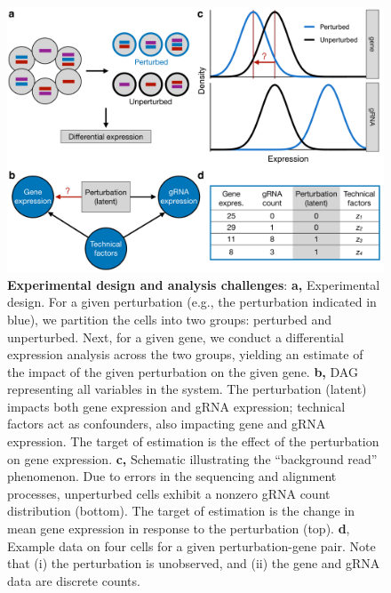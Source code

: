 \documentclass[12pt]{article}
\begin{document}
\begin{figure}[h!]
	\centering
	\includegraphics[width=1\linewidth]{figures/analysis_challenges.pdf}
	\caption{\textbf{Experimental design and analysis challenges}: \textbf{a,} Experimental design. For a given perturbation (e.g., the perturbation indicated in blue), we partition the cells into two groups: perturbed and unperturbed. Next, for a given gene, we conduct a differential expression analysis across the two groups, yielding an estimate of the impact of the given perturbation on the given gene. \textbf{b,} DAG representing all variables in the system. The perturbation (latent) impacts both gene expression and gRNA expression; technical factors act as confounders, also impacting gene and gRNA expression. The target of estimation is the effect of the perturbation on gene expression. \textbf{c,} Schematic illustrating the ``background read'' phenomenon. Due to errors in the sequencing and alignment processes, unperturbed cells exhibit a nonzero gRNA count distribution (bottom). The target of estimation is the change in mean gene expression in response to the perturbation (top). \textbf{d}, Example data on four cells for a given perturbation-gene pair. Note that (i) the perturbation is unobserved, and (ii) the gene and gRNA data are discrete counts.}
	\label{analysis_challenges}
\end{figure}
\end{document}
